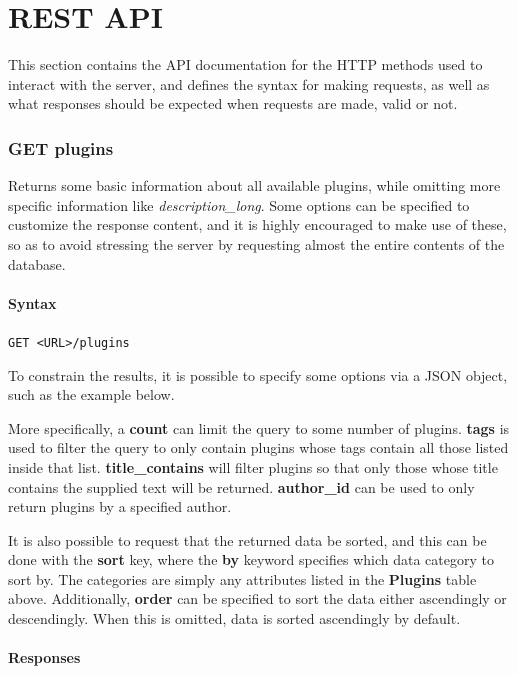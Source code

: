 \documentclass[a4paper, 12pt]{article}
\begin{document}
\part{REST API}
	This section contains the API documentation for the HTTP methods used to interact with the server, and defines the syntax for making requests, as well as what responses should be expected when requests are made, valid or not.

	\section{GET plugins}
		Returns some basic information about all available plugins, while omitting more specific information like \emph{description\_long}. Some options can be specified to customize the response content, and it is highly encouraged to make use of these, so as to avoid stressing the server by requesting almost the entire contents of the database.

		\subsection{Syntax}
			\verb|GET <URL>/plugins|

			To constrain the results, it is possible to specify some options via a JSON object, such as the example below.

			

			More specifically, a \textbf{count} can limit the query to some number of plugins. \textbf{tags} is used to filter the query to only contain plugins whose tags contain all those listed inside that list. \textbf{title\_contains} will filter plugins so that only those whose title contains the supplied text will be returned. \textbf{author\_id} can be used to only return plugins by a specified author.

			It is also possible to request that the returned data be sorted, and this can be done with the \textbf{sort} key, where the \textbf{by} keyword specifies which data category to sort by. The categories are simply any attributes listed in the \textbf{Plugins} table above. Additionally, \textbf{order} can be specified to sort the data either ascendingly or descendingly. When this is omitted, data is sorted ascendingly by default.

		\subsection{Responses}
\end{document}
